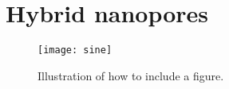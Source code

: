 \section{Hybrid nanopores}




\begin{figure}
  \centering
  \medskip
  \texttt{[image: sine]}
  \caption{Illustration of how to include a figure. }
  \label{fig:sine}
\end{figure}




\cleardoublepage


